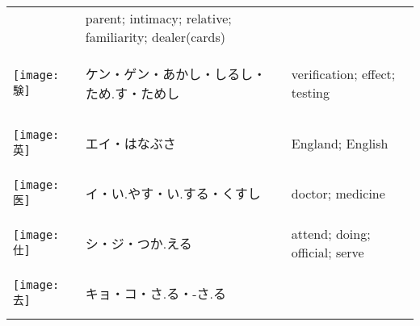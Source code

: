 \documentclass[a4paper,12pt]{extarticle}
\begin{document}
\begin{longtable}{|lp{6cm}p{4cm}|}
&
parent; intimacy; relative; familiarity; dealer(cards)
\\ 
\begin{minipage}{0.3\textwidth}
\centerline{
	\texttt{[image: 験]}
}
\end{minipage}
&
\begin{CJK}{UTF8}{min}ケン・ゲン・あかし・しるし・ため.す・ためし\end{CJK}
&
verification; effect; testing
\\ 
\begin{minipage}{0.3\textwidth}
\centerline{
	\texttt{[image: 英]}
}
\end{minipage}
&
\begin{CJK}{UTF8}{min}エイ・はなぶさ\end{CJK}
&
England; English
\\ 
\begin{minipage}{0.3\textwidth}
\centerline{
	\texttt{[image: 医]}
}
\end{minipage}
&
\begin{CJK}{UTF8}{min}イ・い.やす・い.する・くすし\end{CJK}
&
doctor; medicine
\\ 
\begin{minipage}{0.3\textwidth}
\centerline{
	\texttt{[image: 仕]}
}
\end{minipage}
&
\begin{CJK}{UTF8}{min}シ・ジ・つか.える\end{CJK}
&
attend; doing; official; serve
\\ 
\begin{minipage}{0.3\textwidth}
\centerline{
	\texttt{[image: 去]}
}
\end{minipage}
&
\begin{CJK}{UTF8}{min}キョ・コ・さ.る・-さ.る\end{CJK}

\end{longtable}
\end{document}
